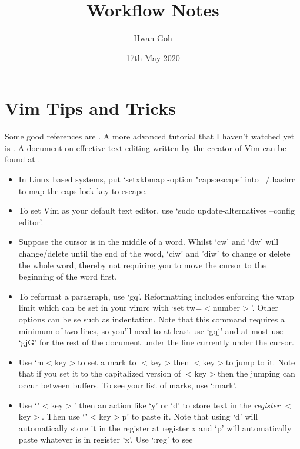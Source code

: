 \documentclass[10pt]{article}
\title{Workflow Notes}
\author{Hwan Goh}
\date{17th May 2020}
\newcommand{\tlangle}{$<$}
\newcommand{\trangle}{$>$}
\begin{document}
\maketitle

\section{Vim Tips and Tricks}
Some good references are \cite{chang2018vim,toomey2015mastering}. A more advanced tutorial that I haven't watched yet
is \cite{chang2020vim}. A document on effective text editing written by the creator of Vim can be found at
\cite{moolenaar2000seven}.
\begin{itemize}
    \item In Linux based systems, put `setxkbmap -option "caps:escape' into ~/.bashrc to map the caps lock key to
        escape.
    \item To set Vim as your default text editor, use `sudo update-alternatives --config editor'.
    \item Suppose the cursor is in the middle of a word. Whilst `cw' and `dw' will change/delete until the end of the
        word, `ciw' and 'diw' to change or delete the whole word, thereby not requiring you to move the cursor to the
        beginning of the word first.
    \item To reformat a paragraph, use `gq'. Reformatting includes enforcing the wrap limit which can be set in your
        vimrc with `set tw=\tlangle number\trangle'. Other options can be se such as indentation. Note that this
        command requires a minimum of two lines, so you'll need to at least use `gqj' and at most use `gjG' for the
        rest of the document under the line currently under the cursor.
    \item Use `m\tlangle key\trangle to set a mark to \tlangle key\trangle then \tlangle key\trangle to jump to it.
        Note that if you set it to the capitalized version of \tlangle key\trangle then the jumping can occur between
        buffers. To see your list of marks, use `:mark'.
    \item Use `"\tlangle key\trangle' then an action like `y' or `d' to store text in the \textit{register} \tlangle
        key\trangle. Then use `"\tlangle key\trangle p' to paste it. Note that using `d' will automatically store it
        in the register at register x and `p' will automatically paste whatever is in register `x'. Use `:reg' to see

\end{itemize}
\end{document}
